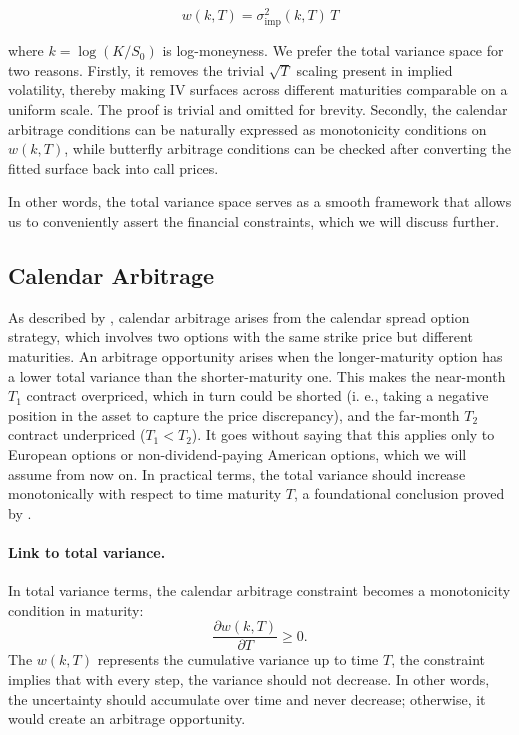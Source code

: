 \documentclass[12pt,oneside]{report}
\theoremstyle{definition}
\theoremstyle{remark}
\begin{document}
\[w(k,T) = \sigma_{\mathrm{imp}}^2(k,T)\,T\]

where $k = \log(K/S_0)$ is log-moneyness. We prefer the total variance space for two reasons. Firstly, it removes the trivial $\sqrt{T}$ scaling present in implied volatility, thereby making IV surfaces across different maturities comparable on a uniform scale. The proof is trivial and omitted for brevity. Secondly, the calendar arbitrage conditions can be naturally expressed as monotonicity conditions on $w(k,T)$, while butterfly arbitrage conditions can be checked after converting the fitted surface back into call prices.

In other words, the total variance space serves as a smooth framework that allows us to conveniently assert the financial constraints, which we will discuss further.

\subsection{Calendar Arbitrage}
\label{subsubsec:calendar-arbitrage}

As described by \citet{gatheral2014arbitrage}, calendar arbitrage arises from the calendar spread option strategy, which involves two options with the same strike price but different maturities. An arbitrage opportunity arises when the longer-maturity option has a lower total variance than the shorter-maturity one. This makes the near-month $T_1$ contract overpriced, which in turn could be shorted (i. e., taking a negative position in the asset to capture the price discrepancy), and the far-month $T_2$ contract underpriced ($T_1 < T_2$). It goes without saying that this applies only to European options or non-dividend-paying American options, which we will assume from now on. In practical terms, the total variance should increase monotonically with respect to time maturity $T$, a foundational conclusion proved by \citet{gatheral2006volatility}. 

\paragraph{Link to total variance.}
In total variance terms, the calendar arbitrage constraint becomes a monotonicity condition in maturity:
\[\frac{\partial w(k,T)}{\partial T} \geq 0.\]
The $w(k,T)$ represents the cumulative variance up to time $T$, the constraint implies that with every step, the variance should not decrease. In other words, the uncertainty should accumulate over time and never decrease; otherwise, it would create an arbitrage opportunity.
\end{document}
